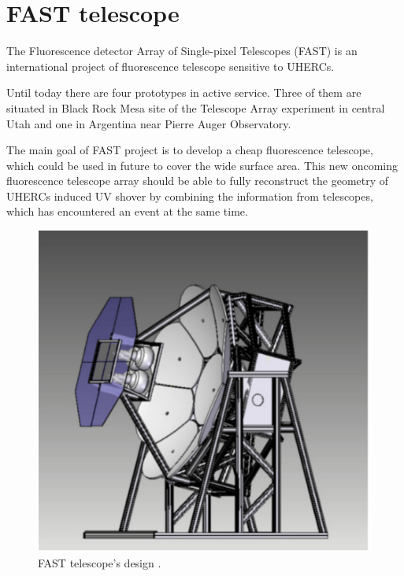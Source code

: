 
\chapter{FAST telescope}
The  Fluorescence  detector  Array  of  Single-pixel  Telescopes  (FAST) is an international project of fluorescence telescope sensitive to UHERCs. 
\par
Until today there are four prototypes in active service. Three of them are situated in Black Rock Mesa site of the Telescope Array experiment in central Utah and one in Argentina near Pierre Auger Observatory.
\par
The main goal of FAST project is to develop a cheap fluorescence telescope, which could be used in future to cover the wide surface area. This new oncoming fluorescence telescope array should be able  
to fully reconstruct the geometry of UHERCs induced UV shover by combining the information from telescopes, which has encountered an event at the same time. 

\begin{figure}[H]
 \centering
 \includegraphics[scale = 0.5]{./pictures/fastTheoretical}
 \caption{FAST telescope's design \cite{MALACARI2020102430}.}
 \label{FASThut}
 
\end{figure}


